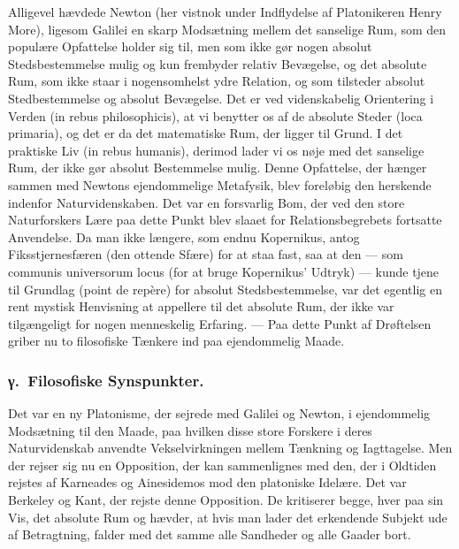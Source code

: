 \documentclass[12pt]{article}
\newcommand{\opage}[1]{\marginnote{\footnotesize\textit{[#1]}}}
\begin{document}
Alligevel hævdede Newton (her vistnok under Indflydelse af Platonikeren Henry
More), ligesom Galilei en skarp Modsætning mellem det sanselige Rum, som den
populære Opfattelse holder sig til, men som ikke gør nogen absolut
Stedsbestemmelse mulig og kun frembyder relativ Bevægelse, og det absolute
Rum, som ikke staar i nogensomhelst ydre Relation, og som tilsteder absolut
Stedbestemmelse og absolut Bevægelse. Det er ved videnskabelig Orientering i
Verden (in rebus philosophicis), at vi benytter
\opage{67} os af de absolute Steder (loca primaria), og det er da det matematiske Rum,
der ligger til Grund. I det praktiske Liv (in rebus humanis), derimod lader vi
os nøje med det sanselige Rum, der ikke gør absolut Bestemmelse mulig. Denne
Opfattelse, der hænger sammen med Newtons ejendommelige Metafysik, blev
foreløbig den herskende indenfor Naturvidenskaben. Det var en forsvarlig Bom,
der ved den store Naturforskers Lære paa dette Punkt blev slaaet for
Relationsbegrebets fortsatte Anvendelse. Da man ikke længere, som endnu
Kopernikus, antog Fiksstjernesfæren (\guillemotright den ottende
Sfære\guillemotleft) for at staa fast, saa at den --- som communis
universorum locus (for at bruge Kopernikus' Udtryk) --- kunde tjene til
Grundlag (point de repère) for absolut Stedsbestemmelse, var det egentlig en
rent mystisk Henvisning at appellere til det absolute Rum, der ikke var
tilgængeligt for nogen menneskelig Erfaring. --- Paa dette Punkt af Drøftelsen
griber nu to filosofiske Tænkere ind paa ejendommelig Maade.

\subsubsection*{γ.~Filosofiske Synspunkter.}%
%
\label{sec:3d-gamma}%
\noindent Det var en ny Platonisme, der sejrede med Galilei og Newton, i
ejendommelig Modsætning til den Maade, paa hvilken disse store Forskere i
deres Naturvidenskab anvendte Vekselvirkningen mellem Tænkning og Iagttagelse.
Men der rejser sig nu en Opposition, der kan sammenlignes med den, der i
Oldtiden rejstes af Karneades og Ainesidemos mod den platoniske Idelære. Det
var Berkeley og Kant, der rejste denne Opposition. De kritiserer begge, hver
paa sin Vis, det absolute Rum og hævder, at hvis man lader det erkendende
Subjekt ude af Betragtning, falder med det samme alle Sandheder og alle Gaader
bort.
\end{document}
